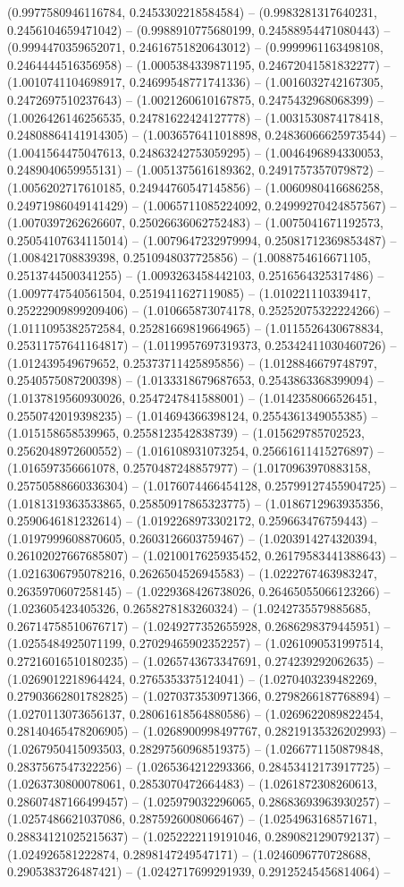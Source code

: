 (0.9977580946116784, 0.2453302218584584) -- (0.9983281317640231, 0.2456104659471042) -- (0.9988910775680199, 0.24588954471080443) -- (0.9994470359652071, 0.24616751820643012) -- (0.9999961163498108, 0.2464444516356958) -- (1.0005384339871195, 0.24672041581832277) -- (1.0010741104698917, 0.24699548771741336) -- (1.0016032742167305, 0.2472697510237643) -- (1.0021260610167875, 0.2475432968068399) -- (1.0026426146256535, 0.24781622424127778) -- (1.0031530874178418, 0.24808864141914305) -- (1.0036576411018898, 0.24836066625973544) -- (1.0041564475047613, 0.24863242753059295) -- (1.0046496894330053, 0.2489040659955131) -- (1.0051375616189362, 0.2491757357079872) -- (1.0056202717610185, 0.24944760547145856) -- (1.0060980416686258, 0.24971986049141429) -- (1.0065711085224092, 0.24999270424857567) -- (1.0070397262626607, 0.25026636062752483) -- (1.0075041671192573, 0.25054107634115014) -- (1.0079647232979994, 0.25081712369853487) -- (1.008421708839398, 0.2510948037725856) -- (1.0088754616671105, 0.2513744500341255) -- (1.0093263458442103, 0.2516564325317486) -- (1.0097747540561504, 0.2519411627119085) -- (1.010221110339417, 0.25222909899209406) -- (1.010665873074178, 0.25252075322224266) -- (1.0111095382572584, 0.25281669819664965) -- (1.0115526430678834, 0.25311757641164817) -- (1.0119957697319373, 0.25342411030460726) -- (1.012439549679652, 0.25373711425895856) -- (1.0128846679748797, 0.2540575087200398) -- (1.0133318679687653, 0.2543863368399094) -- (1.0137819560930026, 0.2547247841588001) -- (1.0142358066526451, 0.2550742019398235) -- (1.014694366398124, 0.2554361349055385) -- (1.015158658539965, 0.2558123542838739) -- (1.015629785702523, 0.2562048972600552) -- (1.016108931073254, 0.25661611415276897) -- (1.016597356661078, 0.2570487248857977) -- (1.0170963970883158, 0.25750588660336304) -- (1.0176074466454128, 0.25799127455904725) -- (1.0181319363533865, 0.25850917865323775) -- (1.0186712963935356, 0.2590646181232614) -- (1.0192268973302172, 0.259663476759443) -- (1.0197999608870605, 0.2603126603759467) -- (1.0203914274320394, 0.26102027667685807) -- (1.0210017625935452, 0.26179583441388643) -- (1.0216306795078216, 0.2626504526945583) -- (1.0222767463983247, 0.2635970607258145) -- (1.0229368426738026, 0.26465055066123266) -- (1.023605423405326, 0.2658278183260324) -- (1.0242735579885685, 0.26714758510676717) -- (1.0249277352655928, 0.2686298379445951) -- (1.0255484925071199, 0.27029465902352257) -- (1.0261090531997514, 0.27216016510180235) -- (1.0265743673347691, 0.274239292062635) -- (1.0269012218964424, 0.2765353375124041) -- (1.0270403239482269, 0.27903662801782825) -- (1.0270373530971366, 0.2798266187768894) -- (1.0270113073656137, 0.28061618564880586) -- (1.0269622089822454, 0.28140465478206905) -- (1.0268900998497767, 0.28219135326202993) -- (1.0267950415093503, 0.28297560968519375) -- (1.0266771150879848, 0.2837567547322256) -- (1.0265364212293366, 0.28453412173917725) -- (1.0263730800078061, 0.2853070472664483) -- (1.0261872308260613, 0.28607487166499457) -- (1.025979032296065, 0.28683693963930257) -- (1.0257486621037086, 0.2875926008066467) -- (1.0254963168571671, 0.28834121025215637) -- (1.0252222119191046, 0.2890821290792137) -- (1.024926581222874, 0.2898147249547171) -- (1.0246096770728688, 0.2905383726487421) -- (1.0242717699291939, 0.29125245456814064) -- 
